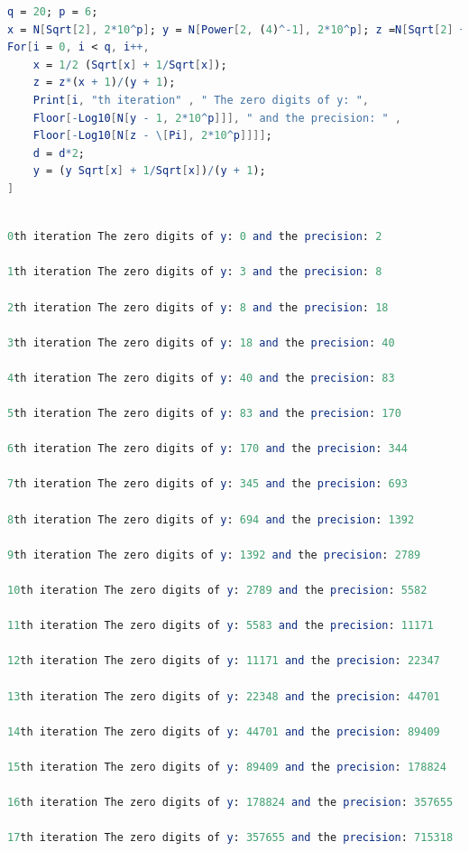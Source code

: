 \documentclass{report}
\begin{document}
\begin{titlepage}
\begin{lstlisting}[language=Mathematica,caption={Code}]
q = 20; p = 6;
x = N[Sqrt[2], 2*10^p]; y = N[Power[2, (4)^-1], 2*10^p]; z =N[Sqrt[2] + 2, 2*10^p]; d = 2;
For[i = 0, i < q, i++,
	x = 1/2 (Sqrt[x] + 1/Sqrt[x]);
	z = z*(x + 1)/(y + 1);
	Print[i, "th iteration" , " The zero digits of y: ", 
	Floor[-Log10[N[y - 1, 2*10^p]]], " and the precision: " , 
	Floor[-Log10[N[z - \[Pi], 2*10^p]]]];
	d = d*2;
	y = (y Sqrt[x] + 1/Sqrt[x])/(y + 1);
]\end{lstlisting}
 
\begin{lstlisting}[language=Mathematica,caption={Output}]

0th iteration The zero digits of y: 0 and the precision: 2

1th iteration The zero digits of y: 3 and the precision: 8

2th iteration The zero digits of y: 8 and the precision: 18

3th iteration The zero digits of y: 18 and the precision: 40

4th iteration The zero digits of y: 40 and the precision: 83

5th iteration The zero digits of y: 83 and the precision: 170

6th iteration The zero digits of y: 170 and the precision: 344

7th iteration The zero digits of y: 345 and the precision: 693

8th iteration The zero digits of y: 694 and the precision: 1392

9th iteration The zero digits of y: 1392 and the precision: 2789

10th iteration The zero digits of y: 2789 and the precision: 5582

11th iteration The zero digits of y: 5583 and the precision: 11171

12th iteration The zero digits of y: 11171 and the precision: 22347

13th iteration The zero digits of y: 22348 and the precision: 44701

14th iteration The zero digits of y: 44701 and the precision: 89409

15th iteration The zero digits of y: 89409 and the precision: 178824

16th iteration The zero digits of y: 178824 and the precision: 357655

17th iteration The zero digits of y: 357655 and the precision: 715318


\end{lstlisting}
\end{titlepage}
\end{document}
